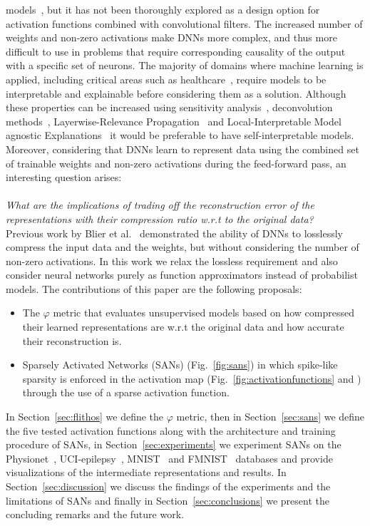 \documentclass[journal]{IEEEtran}
\begin{document}
models~\cite{heiberg2018firing}, but it has not been thoroughly
explored as a design option for activation functions combined with
convolutional filters.
The increased number of weights and non-zero activations make DNNs
more complex, and thus more difficult to use in problems that require
corresponding causality of the output with a specific set of neurons.
The majority of domains where machine learning is applied, including
critical areas such as healthcare~\cite{bizopoulos2019deep}, require
models to be interpretable and explainable before considering them as
a solution.
Although these properties can be increased using sensitivity
analysis~\cite{simonyan2013deep}, deconvolution
methods~\cite{zeiler2014visualizing}, Layerwise-Relevance
Propagation~\cite{bach2015pixel} and Local-Interpretable Model
agnostic Explanations~\cite{ribeiro2016should} it would be preferable
to have self-interpretable models.
Moreover, considering that DNNs learn to represent data using the
combined set of trainable weights and non-zero activations during the
feed-forward pass, an interesting question arises:
\\\\
\indent\textit{What are the implications of trading off the
  reconstruction error of the representations with their compression
ratio w.r.t to the original data?}
\\
Previous work by Blier et al.~\cite{blier2018description}
demonstrated the ability of DNNs to losslessly compress the input
data and the weights, but without considering the number of non-zero
activations.
In this work we relax the lossless requirement and also consider
neural networks purely as function approximators instead of probabilist models.
The contributions of this paper are the following proposals:
\begin{itemize}
  \item The $\varphi$ metric that evaluates unsupervised models based
    on how compressed their learned representations are w.r.t the
    original data and how accurate their reconstruction is.
  \item Sparsely Activated Networks (SANs) (Fig.~\ref{fig:sans}) in
    which spike-like sparsity is enforced in the activation map
    (Fig.~\ref{fig:activationfunctions}
    and ) through the use of a sparse
    activation function.
\end{itemize}
In Section~\ref{sec:flithos} we define the $\varphi$ metric, then in
Section~\ref{sec:sans} we define the five tested activation functions
along with the architecture and training procedure of SANs, in
Section~\ref{sec:experiments} we experiment SANs on the
Physionet~\cite{goldberger2000physiobank},
UCI-epilepsy~\cite{andrzejak2001indications},
MNIST~\cite{lecun1998gradient} and FMNIST~\cite{xiao2017fashion}
databases and provide visualizations of the intermediate
representations and results.
In Section~\ref{sec:discussion} we discuss the findings of the
experiments and the limitations of SANs and finally in
Section~\ref{sec:conclusions} we present the concluding remarks and
the future work.
\end{document}
